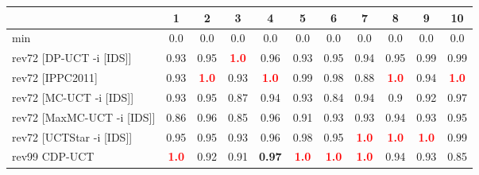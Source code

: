 \documentclass{article}
\begin{document}
\begin{tabular}{|l|r@{$\pm$}rr@{$\pm$}rr@{$\pm$}rr@{$\pm$}rr@{$\pm$}rr@{$\pm$}rr@{$\pm$}rr@{$\pm$}rr@{$\pm$}rr@{$\pm$}r|}
\hline

& \multicolumn{2}{c}{1}
& \multicolumn{2}{c}{2}
& \multicolumn{2}{c}{3}
& \multicolumn{2}{c}{4}
& \multicolumn{2}{c}{5}
& \multicolumn{2}{c}{6}
& \multicolumn{2}{c}{7}
& \multicolumn{2}{c}{8}
& \multicolumn{2}{c}{9}
& \multicolumn{2}{c|}{10}
\\
\hline
\hline
min
& \multicolumn{2}{c}{0.0}
& \multicolumn{2}{c}{0.0}
& \multicolumn{2}{c}{0.0}
& \multicolumn{2}{c}{0.0}
& \multicolumn{2}{c}{0.0}
& \multicolumn{2}{c}{0.0}
& \multicolumn{2}{c}{0.0}
& \multicolumn{2}{c}{0.0}
& \multicolumn{2}{c}{0.0}
& \multicolumn{2}{c|}{0.0}
\\
rev72 [DP-UCT -i [IDS]]
& \multicolumn{2}{c}{0.93}
& \multicolumn{2}{c}{0.95}
& \multicolumn{2}{c}{\textbf{\textcolor{red}{1.0}}}
& \multicolumn{2}{c}{0.96}
& \multicolumn{2}{c}{0.93}
& \multicolumn{2}{c}{0.95}
& \multicolumn{2}{c}{0.94}
& \multicolumn{2}{c}{0.95}
& \multicolumn{2}{c}{0.99}
& \multicolumn{2}{c|}{0.99}
\\
rev72 [IPPC2011]
& \multicolumn{2}{c}{0.93}
& \multicolumn{2}{c}{\textbf{\textcolor{red}{1.0}}}
& \multicolumn{2}{c}{0.93}
& \multicolumn{2}{c}{\textbf{\textcolor{red}{1.0}}}
& \multicolumn{2}{c}{0.99}
& \multicolumn{2}{c}{0.98}
& \multicolumn{2}{c}{0.88}
& \multicolumn{2}{c}{\textbf{\textcolor{red}{1.0}}}
& \multicolumn{2}{c}{0.94}
& \multicolumn{2}{c|}{\textbf{\textcolor{red}{1.0}}}
\\
rev72 [MC-UCT -i [IDS]]
& \multicolumn{2}{c}{0.93}
& \multicolumn{2}{c}{0.95}
& \multicolumn{2}{c}{0.87}
& \multicolumn{2}{c}{0.94}
& \multicolumn{2}{c}{0.93}
& \multicolumn{2}{c}{0.84}
& \multicolumn{2}{c}{0.94}
& \multicolumn{2}{c}{0.9}
& \multicolumn{2}{c}{0.92}
& \multicolumn{2}{c|}{0.97}
\\
rev72 [MaxMC-UCT -i [IDS]]
& \multicolumn{2}{c}{0.86}
& \multicolumn{2}{c}{0.96}
& \multicolumn{2}{c}{0.85}
& \multicolumn{2}{c}{0.96}
& \multicolumn{2}{c}{0.91}
& \multicolumn{2}{c}{0.93}
& \multicolumn{2}{c}{0.93}
& \multicolumn{2}{c}{0.94}
& \multicolumn{2}{c}{0.93}
& \multicolumn{2}{c|}{0.95}
\\
rev72 [UCTStar -i [IDS]]
& \multicolumn{2}{c}{0.95}
& \multicolumn{2}{c}{0.95}
& \multicolumn{2}{c}{0.93}
& \multicolumn{2}{c}{0.96}
& \multicolumn{2}{c}{0.98}
& \multicolumn{2}{c}{0.95}
& \multicolumn{2}{c}{\textbf{\textcolor{red}{1.0}}}
& \multicolumn{2}{c}{\textbf{\textcolor{red}{1.0}}}
& \multicolumn{2}{c}{\textbf{\textcolor{red}{1.0}}}
& \multicolumn{2}{c|}{0.99}
\\
\hline
rev99 CDP-UCT
& \multicolumn{2}{c}{\textbf{\textcolor{red}{1.0}}}
& \multicolumn{2}{c}{0.92}
& \multicolumn{2}{c}{0.91}
& \multicolumn{2}{c}{\textbf{0.97}}
& \multicolumn{2}{c}{\textbf{\textcolor{red}{1.0}}}
& \multicolumn{2}{c}{\textbf{\textcolor{red}{1.0}}}
& \multicolumn{2}{c}{\textbf{\textcolor{red}{1.0}}}
& \multicolumn{2}{c}{0.94}
& \multicolumn{2}{c}{0.93}
& \multicolumn{2}{c|}{0.85}
\\
\hline
\end{tabular}%
\end{document}
